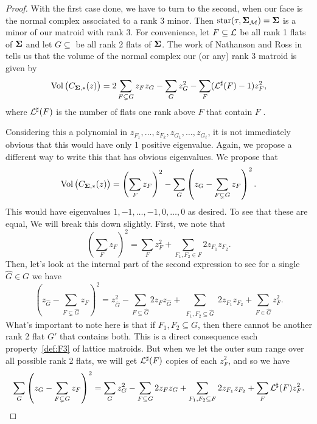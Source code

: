 \documentclass[12pt,oneside]{../../sfsuthesis}
\begin{document}
\begin{proof}
    With the first case done, we have to turn to the second, when our face is the normal complex associated to a rank 3 minor.
    Then \( \operatorname{star}(\tau, \bm{\Sigma}_{\mathcal{M}}) = \bm{\Sigma} \) is a minor of our matroid with rank 3.
    For convenience, let \( F \subseteq \mathcal{L} \) be all rank 1 flats of \( \bm{\Sigma} \) and let \( G \subseteq \) be all rank 2 flats of \( \bm{\Sigma} \).
    The work of Nathanson and Ross in \cite{nathansonTropicalFansNormal2021}  tells us that the volume of the normal complex our (or any) rank 3 matroid is given by
    \[
        \operatorname{Vol}\big(C_{\bm{\Sigma}, \ast}(z)\big) = 2\sum_{F \subsetneq G} z_F z_G - \sum_{G} z_G^2 - \sum_{F}(\mathcal{L}^\sharp(F) - 1)z_F^2,
    \]
    where \( \mathcal{L}^\sharp(F) \) is the number of flats one rank above \( F \) that contain \( F \) .

    Considering this a polynomial in \( z_{F_1}, \dots, z_{F_k}, z_{G_1}, \dots, z_{G_\ell} \), it is not immediately obvious that this would have only 1 positive eigenvalue.
    Again, we propose a different way to write this that has obvious eigenvalues.
    We propose that
    \[
        \operatorname{Vol}\big(C_{\bm{\Sigma}, \ast}(z)\big) = \left( \sum_F z_F\right)^2 - \sum_G \left( z_G - \sum_{F \subsetneq G} z_F\right)^2.
    \]
    This would have eigenvalues \( 1, -1, \dots, -1, 0, \dots, 0 \) as desired.
    To see that these are equal, We will break this down slightly.
    First, we note that
    \begin{equation}
        \left( \sum_F z_F\right)^2 = \sum_F z_F^2 + \sum_{F_1, F_2 \in F} 2z_{F_1}z_{F_2}.
    \end{equation}
    Then, let's look at the internal part of the second expression to see for a single \( \hat{G} \in G \) we have
    \begin{equation}
        \left( z_{\hat{G}} - \sum_{F \subsetneq {\hat{G}}} z_F \right)^2 = z_{\hat{G}}^2 - \sum_{F \subseteq \hat{G}}2 z_F z_{\hat{G}} + \sum_{\substack{F_1,F_2 \subseteq \hat{G}}}2z_{F_1} z_{F_2} + \sum_{F \in \hat{G}} z_F^2.
    \end{equation}
    What's important to note here is that if \( F_1, F_2 \subseteq G \), then there cannot be another rank 2 flat \( G' \) that contains both.
    This is a direct consequence each property~\ref{def:F3} of lattice matroids.
    But when we let the outer sum range over all possible rank 2 flats, we will get \( \mathcal{L}^\sharp(F) \) copies of each \( z_F^2 \), and so we have
    \begin{equation}
        \sum_G \left( z_G - \sum_{F \subsetneq G} z_F\right)^2 =
        \sum_{G}z_G^2
        - \sum_{F \subseteq G}2 z_F z_{G}
        + \sum_{\substack{F_1,F_2 \subseteq F}}2z_{F_1} z_{F_2}
        + \sum_{F} \mathcal{L}^\sharp(F)z_F^2.
    \end{equation}


\end{proof}
\end{document}
